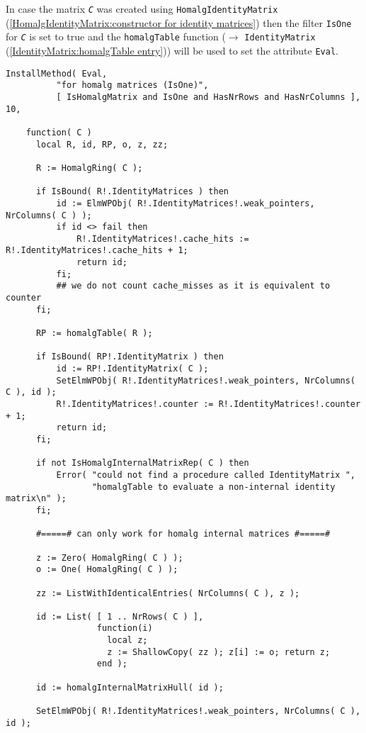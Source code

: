 \documentclass[a4paper,11pt]{report}
\begin{document}
{{{ In case the matrix \mbox{\texttt{\slshape C}} was created using \texttt{HomalgIdentityMatrix} (\ref{HomalgIdentityMatrix:constructor for identity matrices}) then the filter \texttt{IsOne} for \mbox{\texttt{\slshape C}} is set to true and the \texttt{homalgTable} function ($\to$ \texttt{IdentityMatrix} (\ref{IdentityMatrix:homalgTable entry})) will be used to set the attribute \texttt{Eval}. 
\begin{Verbatim}[fontsize=\small,frame=single,label=Code]
  InstallMethod( Eval,
          "for homalg matrices (IsOne)",
          [ IsHomalgMatrix and IsOne and HasNrRows and HasNrColumns ], 10,
          
    function( C )
      local R, id, RP, o, z, zz;
      
      R := HomalgRing( C );
      
      if IsBound( R!.IdentityMatrices ) then
          id := ElmWPObj( R!.IdentityMatrices!.weak_pointers, NrColumns( C ) );
          if id <> fail then
              R!.IdentityMatrices!.cache_hits := R!.IdentityMatrices!.cache_hits + 1;
              return id;
          fi;
          ## we do not count cache_misses as it is equivalent to counter
      fi;
      
      RP := homalgTable( R );
      
      if IsBound( RP!.IdentityMatrix ) then
          id := RP!.IdentityMatrix( C );
          SetElmWPObj( R!.IdentityMatrices!.weak_pointers, NrColumns( C ), id );
          R!.IdentityMatrices!.counter := R!.IdentityMatrices!.counter + 1;
          return id;
      fi;
      
      if not IsHomalgInternalMatrixRep( C ) then
          Error( "could not find a procedure called IdentityMatrix ",
                 "homalgTable to evaluate a non-internal identity matrix\n" );
      fi;
      
      #=====# can only work for homalg internal matrices #=====#
      
      z := Zero( HomalgRing( C ) );
      o := One( HomalgRing( C ) );
      
      zz := ListWithIdenticalEntries( NrColumns( C ), z );
      
      id := List( [ 1 .. NrRows( C ) ],
                  function(i)
                    local z;
                    z := ShallowCopy( zz ); z[i] := o; return z;
                  end );
      
      id := homalgInternalMatrixHull( id );
      
      SetElmWPObj( R!.IdentityMatrices!.weak_pointers, NrColumns( C ), id );
      

\end{Verbatim}}}}
\end{document}
